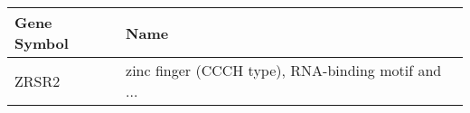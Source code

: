 \begin{tabular}{ll}
\toprule
Gene Symbol &                                               Name \\
\midrule
      ZRSR2 & zinc finger (CCCH type), RNA-binding motif and ... \\
\bottomrule
\end{tabular}

